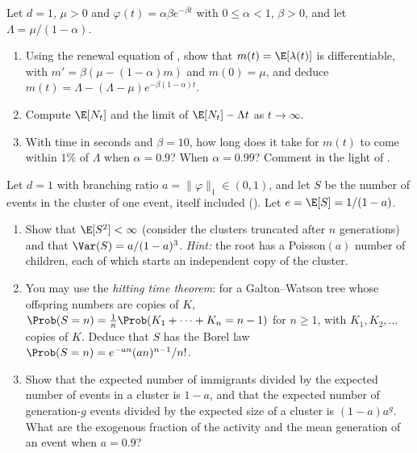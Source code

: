 
\begin{exercise}\label{ex:hk-exponential}
\easy Let $d=1$, $\mu>0$ and $\varphi(t)=\alpha\beta e^{-\beta t}$ with $0\le\alpha<1$, $\beta>0$, and let
$\Lambda=\mu/(1-\alpha)$.
\begin{enumerate}[label=(\alph*)]
  \item Using the renewal equation of , show that $m(t)=\E[\lambda(t)]$ is
    differentiable, with $m'=\beta(\mu-(1-\alpha)m)$ and $m(0)=\mu$, and deduce
    $m(t)=\Lambda-(\Lambda-\mu)e^{-\beta(1-\alpha)t}$.
  \item Compute $\E[N_t]$ and the limit of $\E[N_t]-\Lambda t$ as $t\to\infty$.
  \item With time in seconds and $\beta=10$, how long does it take for $m(t)$ to come within $1\%$ of $\Lambda$ when
    $\alpha=0.9$? When $\alpha=0.99$? Comment in the light of .
\end{enumerate}
\end{exercise}

\begin{exercise}\label{ex:hk-cluster}
\medium Let $d=1$ with branching ratio $a=\|\varphi\|_1\in(0,1)$, and let $S$ be the number of events in the cluster
of one event, itself included (). Let $e=\E[S]=1/(1-a)$.
\begin{enumerate}[label=(\alph*)]
  \item Show that $\E[S^2]<\infty$ (consider the clusters truncated after $n$ generations) and that
    $\Var(S)=a/(1-a)^3$. \emph{Hint:} the root has a Poisson$(a)$ number of children, each of which starts an
    independent copy of the cluster.
  \item You may use the \emph{hitting time theorem}: for a Galton--Watson tree whose offspring numbers are \iid
    copies of $K$, $\Prob(S=n)=\frac1n\Prob(K_1+\dots+K_n=n-1)$ for $n\ge1$, with $K_1,K_2,\dots$ \iid copies of $K$.
    Deduce that $S$ has the Borel law $\Prob(S=n)=e^{-an}(an)^{n-1}/n!$.
  \item Show that the expected number of immigrants divided by the expected number of events in a cluster is
    $1-a$, and that the expected number of generation-$g$ events divided by the expected size of a cluster is
    $(1-a)a^g$. What are the exogenous fraction of the activity and the mean generation of an event when $a=0.9$?
\end{enumerate}
\end{exercise}

